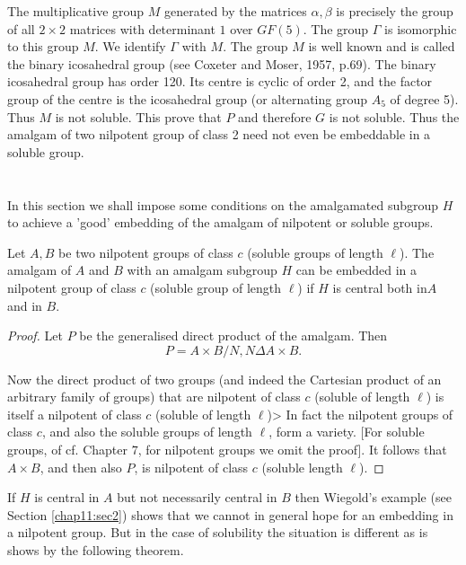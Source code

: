 The multiplicative group $M$ generated by the matrices $\alpha, \beta$
is precisely the group of all $2 \times 2$ matrices with determinant
$1$ over $GF(5)$. The group $\Gamma$ is isomorphic to this group
$M$. We identify $\Gamma$ with $M$. The group $M$ is well known and is
called the binary icosahedral group (see Coxeter and Moser,
1957, p.69). The binary icosahedral group has order 120. Its centre
is cyclic of order 2, and the factor group of the centre is the
icosahedral group (or alternating group $A_5$ of degree 5). Thus $M$
is not soluble. This prove that $P$ and therefore $G$ is not
soluble. Thus the amalgam of two nilpotent group of class 2 need not
even be embeddable in a soluble group. 

\section{}\label{chap11:sec3} %

In this section we shall impose some conditions on  the amalgamated
subgroup $H$ to achieve a 'good' embedding of the amalgam of nilpotent
or soluble groups. 

\begin{theorem}\label{chap11:sec3:thm2} %
  Let $A,B$ be two nilpotent groups of class $c$ (soluble groups of
  length $\ell$). The amalgam of $A$ and $B$ with an amalgam subgroup
  $H$ can be embedded in a nilpotent group of class $c$ (soluble group
  of length $\ell$) if $H$ is central both in\pageoriginale $A$ and in $B$. 
\end{theorem}

\begin{proof}
  Let $P$ be the generalised direct product of the amalgam. Then
  $$
  P=A \times B/N,N \Delta A \times B.
  $$

  Now the direct product of two groups (and indeed the Cartesian
  product of an arbitrary family of groups) that are nilpotent of
  class $c$ (soluble of length $\ell$) is itself a nilpotent of class
  $c$ (soluble of length $\ell$)> In fact the nilpotent groups of
  class $c$, and also the soluble groups of length $\ell$, form a
  variety. [For soluble groups, of cf. Chapter $7$, for nilpotent
    groups we omit the proof]. It follows that $A \times B$, and then
  also $P$, is nilpotent of class $c$ (soluble length $\ell$). 
\end{proof}

If $H$ is central in $A$ but not necessarily central in $B$ then
Wiegold's example (see Section \ref{chap11:sec2}) shows that we cannot in general
hope for an embedding in a nilpotent group. But in the case of
solubility the situation is different as is shows by the following
theorem. 

